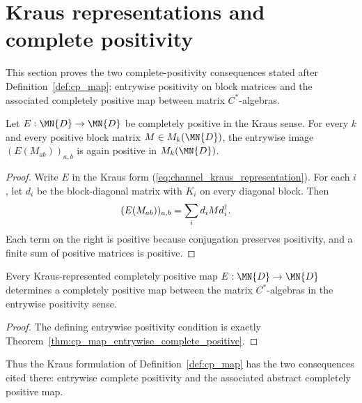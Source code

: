 \section{Kraus representations and complete positivity}

This section proves the two complete-positivity consequences stated after
Definition~\ref{def:cp_map}: entrywise positivity on block matrices and the
associated completely positive map between matrix $C^*$-algebras.

\begin{theorem}
    \label{thm:cp_map_entrywise_complete_positive}
    \leanok
    Let $E : \MN{D} \to \MN{D}$ be completely positive in the Kraus sense.
    For every $k$ and every positive block matrix
    $M \in M_k(\MN{D})$, the entrywise image
    $(E(M_{ab}))_{a,b}$ is again positive in $M_k(\MN{D})$.
\end{theorem}

\begin{proof}\leanok
    Write $E$ in the Kraus form (\ref{eq:channel_kraus_representation}).
    For each $i$, let $d_i$ be the block-diagonal matrix with $K_i$ on every
    diagonal block. Then
    \begin{align}
        (E(M_{ab}))_{a,b}
         & =\sum_i d_i M d_i^\dagger.
        \notag
    \end{align}
    Each term on the right is positive because conjugation preserves
    positivity, and a finite sum of positive matrices is positive.
\end{proof}

\begin{theorem}
    \label{thm:cp_map_to_abstract_completely_positive}
    \leanok
    Every Kraus-represented completely positive map
    $E : \MN{D} \to \MN{D}$ determines a completely positive map between
    the matrix $C^*$-algebras in the entrywise positivity sense.
\end{theorem}

\begin{proof}\leanok
    The defining entrywise positivity condition is exactly
    Theorem~\ref{thm:cp_map_entrywise_complete_positive}.
\end{proof}

Thus the Kraus formulation of Definition~\ref{def:cp_map} has the two
consequences cited there: entrywise complete positivity and the associated
abstract completely positive map.

